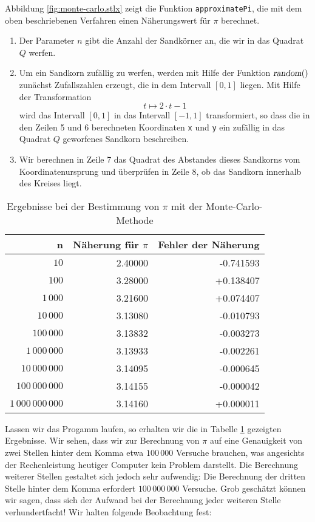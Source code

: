Abbildung \ref{fig:monte-carlo.stlx} zeigt die Funktion \texttt{approximatePi}, die mit dem oben
beschriebenen Verfahren einen N\"aherungswert f\"ur $\pi$ berechnet.
\begin{enumerate}
\item Der Parameter $n$ gibt die Anzahl der Sandk\"orner an, die wir in das Quadrat $Q$ werfen.
\item Um ein Sandkorn zuf\"allig zu werfen, werden mit Hilfe der Funktion $\textsl{random}()$ 
      zun\"achst Zufallszahlen erzeugt, die in dem
      Intervall $[0,1]$ liegen.  Mit Hilfe der Transformation 
      \[ t \mapsto 2 \cdot t - 1  \]
      wird das Intervall $[0,1]$ in das Intervall $[-1, 1]$ transformiert, so dass die in den Zeilen 5 und 6
      berechneten Koordinaten \texttt{x} und \texttt{y} ein zuf\"allig in das Quadrat $Q$ 
      geworfenes Sandkorn beschreiben.
\item Wir berechnen in Zeile 7 das Quadrat des  Abstandes dieses Sandkorns vom
      Koordinatenursprung und \"uberpr\"ufen in Zeile 8, ob das Sandkorn innerhalb des Kreises liegt.
\end{enumerate}

\begin{table}[htbp]
  \label{tab:pi}
  \centering
  \begin{tabular}[t]{|r|r|r|}
  \hline
  n & N\"aherung f\"ur $\pi$ & Fehler der N\"aherung \\
  \hline
  \hline
               $10$ & 2.40000 & -0.741593 \\
\hline
              $100$ & 3.28000 & +0.138407 \\
\hline
           $1\,000$ & 3.21600 & +0.074407 \\
\hline
          $10\,000$ & 3.13080 & -0.010793 \\
\hline
         $100\,000$ & 3.13832 & -0.003273 \\
\hline
      $1\,000\,000$ & 3.13933 & -0.002261 \\
\hline
     $10\,000\,000$ & 3.14095 & -0.000645 \\
\hline
    $100\,000\,000$ & 3.14155 & -0.000042 \\
\hline
 $1\,000\,000\,000$ & 3.14160 & +0.000011 \\
\hline
  \end{tabular}
  \caption{Ergebnisse bei der Bestimmung von $\pi$ mit der Monte-Carlo-Methode}
\end{table}

Lassen wir das Progamm laufen, so erhalten wir die in Tabelle \ref{tab:pi} gezeigten Ergebnisse.
Wir sehen, dass wir zur Berechnung von $\pi$ auf eine Genauigkeit von zwei Stellen hinter dem Komma etwa $100\,000$
Versuche brauchen, was angesichts der Rechenleistung heutiger Computer kein Problem darstellt.  Die Berechnung
weiterer Stellen gestaltet sich jedoch sehr aufwendig:  Die Berechnung der dritten Stelle hinter dem Komma
erfordert  $100\,000\,000$ Versuche. Grob gesch\"atzt k\"onnen wir
sagen, dass sich der Aufwand bei der Berechnung jeder weiteren Stelle verhundertfacht!  
Wir halten folgende Beobachtung fest:

